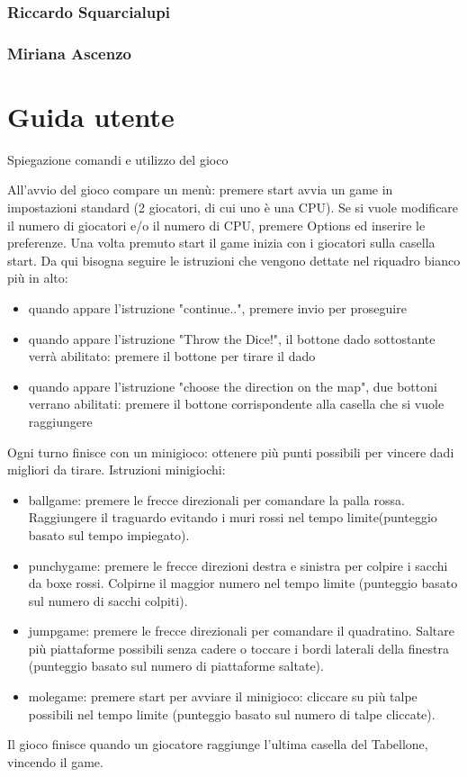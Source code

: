 \documentclass[a4paper,12pt]{report}
\begin{document}
    \subsection{Riccardo Squarcialupi}
    \subsection{Miriana Ascenzo}







	\appendix
	\chapter{Guida utente}

	Spiegazione comandi e utilizzo del gioco

	All'avvio del gioco compare un menù: premere start avvia un game in impostazioni standard (2 giocatori, di cui uno è una CPU).
	Se si vuole modificare il numero di giocatori e/o il numero di CPU, premere Options ed inserire le preferenze.
	Una volta premuto start il game inizia con i giocatori sulla casella start.
	Da qui bisogna seguire le istruzioni che vengono dettate nel riquadro bianco più in alto:
	\begin {itemize}
		\item quando appare l'istruzione "continue..", premere invio per proseguire
		\item quando appare l'istruzione "Throw the Dice!", il bottone dado sottostante verrà abilitato: premere il bottone per tirare il dado
		\item quando appare l'istruzione "choose the direction on the map", due bottoni verrano abilitati: premere il bottone corrispondente alla casella che si vuole raggiungere
	\end {itemize}
	Ogni turno finisce con un minigioco: ottenere più punti possibili per vincere dadi migliori da tirare.
	Istruzioni minigiochi:
	\begin {itemize}
		\item ballgame: premere le frecce direzionali per comandare la palla rossa. Raggiungere il traguardo evitando i muri rossi nel tempo limite(punteggio basato sul tempo impiegato).
		\item punchygame: premere le frecce direzioni destra e sinistra per colpire i sacchi da boxe rossi. Colpirne il maggior numero nel tempo limite (punteggio basato sul numero di sacchi colpiti).
		\item jumpgame: premere le frecce direzionali per comandare il quadratino. Saltare più piattaforme possibili senza cadere o toccare i bordi laterali della finestra (punteggio basato sul numero di piattaforme saltate).
		\item molegame: premere start per avviare il minigioco: cliccare su più talpe possibili nel tempo limite (punteggio basato sul numero di talpe cliccate).
	\end {itemize}
	Il gioco finisce quando un giocatore raggiunge l'ultima casella del Tabellone, vincendo il game.


	
	
\end{document}
